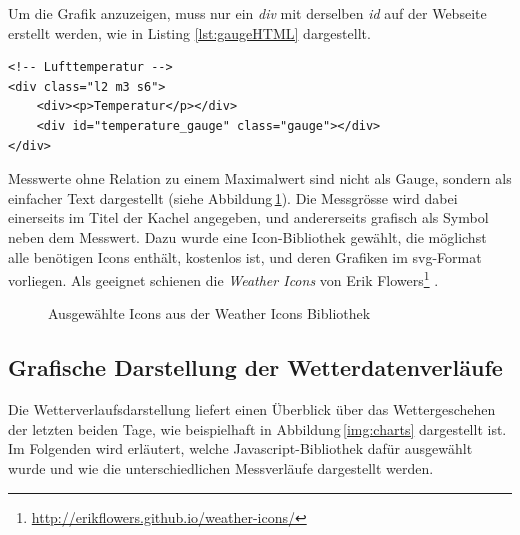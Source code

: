 \noindent
Um die Grafik anzuzeigen, muss nur ein \emph{div} mit derselben \emph{id} auf der Webseite erstellt werden, wie in Listing \ref{lst:gaugeHTML} dargestellt.

\vspace{3mm}
\begin{lstlisting}[label=lst:gaugeHTML,caption=Container für die Gauge auf der Webseite, language=HTML5, style=htmlcssjs]
<!-- Lufttemperatur -->
<div class="l2 m3 s6">
    <div><p>Temperatur</p></div>
    <div id="temperature_gauge" class="gauge"></div>
</div>
\end{lstlisting}
\vspace{3mm}


\noindent
Messwerte ohne Relation zu einem Maximalwert sind nicht als Gauge, sondern als einfacher Text dargestellt (siehe Abbildung\,\ref{img:icons}). Die Messgrösse wird dabei einerseits im Titel der Kachel angegeben, und andererseits grafisch als Symbol neben dem Messwert. Dazu wurde eine Icon-Bibliothek gewählt, die möglichst alle benötigen Icons enthält, kostenlos ist, und deren Grafiken im svg-Format vorliegen. Als geeignet schienen die \emph{Weather Icons} von Erik Flowers\footnote{ \url{http://erikflowers.github.io/weather-icons/}} .


\vspace{3mm}
\begin{figure}[htb!]
	\centering
	\caption{Ausgewählte Icons aus der Weather Icons Bibliothek}
	\label{img:icons}
\end{figure}



\subsection{Grafische Darstellung der Wetterdatenverläufe}
Die Wetterverlaufsdarstellung liefert einen Überblick über das Wettergeschehen der letzten beiden Tage, wie beispielhaft in Abbildung\,\ref{img:charts} dargestellt ist. Im Folgenden wird erläutert, welche Javascript-Bibliothek dafür ausgewählt wurde und wie die unterschiedlichen Messverläufe dargestellt werden.

